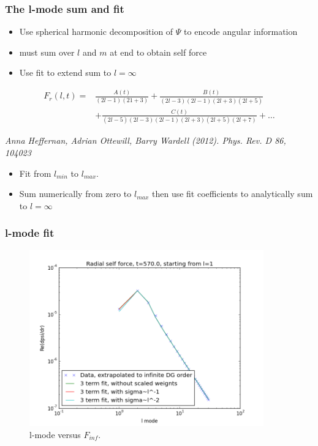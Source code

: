 \documentclass{beamer}
\begin{document}
\begin{frame}
  \frametitle{The l-mode sum and fit}
  \begin{itemize}
  \item Use spherical harmonic decomposition of $\Psi$ to encode angular information
  \item must sum over $l$ and $m$ at end to obtain self force
  \item Use fit to extend sum to $l=\infty$
  \end{itemize}
  
  \begin{eqnarray}
    F_r(l,t)=&\frac{A(t)}{(2l-1)(21+3)}+\frac{B(t)}{(2l-3)(2l-1)(2l+3)(2l+5)}\nonumber \\
    &+\frac{C(t)}{(2l-5)(2l-3)(2l-1)(2l+3)(2l+5)(2l+7)}+\ldots
  \end{eqnarray}

   {\em Anna Heffernan, Adrian Ottewill, Barry Wardell (2012). Phys. Rev. D 86, 104023}

  \begin{itemize}
  \item Fit from $l_{min}$ to $l_{max}$.
  \item Sum numerically from zero to $l_{max}$ then use fit coefficients to analytically sum to $l=\infty$

  \end{itemize}
\end{frame}


\begin{frame}
  \frametitle{l-mode fit}
  \begin{figure}
    \includegraphics[width=0.9\textwidth]{fiterrscalecorrect3term570l1}
    \caption{l-mode versus $F_{inf}$.}
  \end{figure}
\end{frame}
\end{document}
